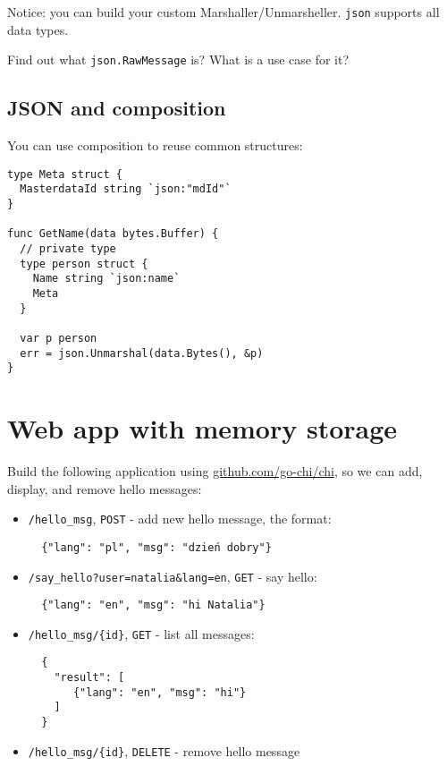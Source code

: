 \documentclass[11pt, letterpaper]{article}
\begin{document}
Notice: you can build your custom Marshaller/Unmarsheller. \verb|json| supports all data types.

\bigskip

Find out what \verb|json.RawMessage| is? What is a use case for it?

\subsection{JSON and composition}

You can use composition to reuse common structures:

\begin{verbatim}
type Meta struct {
  MasterdataId string `json:"mdId"`
}

func GetName(data bytes.Buffer) {
  // private type
  type person struct {
    Name string `json:name`
    Meta
  }

  var p person
  err = json.Unmarshal(data.Bytes(), &p)
}
\end{verbatim}

\section{Web app with memory storage}

Build the following application using \href{https://github.com/go-chi/chi}{github.com/go-chi/chi}, so we can add, display, and remove hello messages:

\begin{itemize}
\item \verb|/hello_msg|, \verb|POST| - add new hello message, the format: \begin{verbatim}
  {"lang": "pl", "msg": "dzień dobry"}
  \end{verbatim}

\item \verb|/say_hello?user=natalia&lang=en|, \verb|GET| - say hello: \begin{verbatim}
  {"lang": "en", "msg": "hi Natalia"}
  \end{verbatim}
\item \verb|/hello_msg/{id}|, \verb|GET| - list all messages: \begin{verbatim}
  {
    "result": [
       {"lang": "en", "msg": "hi"}
    ]
  }
  \end{verbatim}
\item \verb|/hello_msg/{id}|, \verb|DELETE| - remove hello message
\end{itemize}
\end{document}

